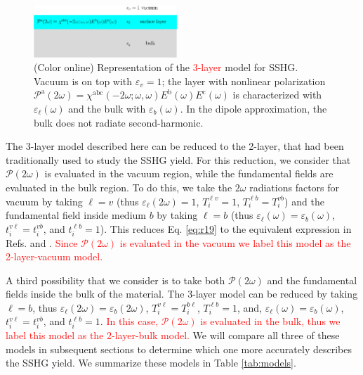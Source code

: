 \documentclass[prb,superscriptaddress,showpacs,twocolumn,letterpaper]{revtex4}
\newcommand{\correction}[1]{\textcolor{red}{#1}}
\begin{document}
\begin{figure}[t]
\centering 
\includegraphics[width=0.48\textwidth]{fig1}
\caption{(Color online) Representation of the \correction{3-layer} model for SSHG. 
Vacuum is on top with $\varepsilon_{v}=1$; the layer with nonlinear polarization 
$\mathcal{P}^{\mathrm{a}}(2\omega) =
\chi^{\mathrm{abc}}(-2\omega;\omega,\omega) 
E^{\mathrm{b}}(\omega)E^{\mathrm{c}}(\omega)$ is characterized with 
$\varepsilon_{\ell}(\omega)$ and the bulk with $\varepsilon_{b}(\omega)$. In the 
dipole approximation, the bulk does not radiate 
second-harmonic.\label{fig:3layer}}
\end{figure}

The 3-layer model described here can be reduced to the
2-layer,\cite{mizrahiJOSA88, sipePRB87,bloembergenPR62} that had been
traditionally used to study the SSHG yield. For this reduction, we consider that
$\boldsymbol{\mathcal{P}}(2\omega)$ is evaluated in the vacuum region, while the
fundamental fields are evaluated in the bulk region. To do this, we take the
$2\omega$ radiations factors for vacuum by taking $\ell=v$ (thus
$\varepsilon_{\ell}(2\omega)=1$, $T^{\ell v}_{i}=1$, $T^{\ell
b}_{i}=T^{vb}_{i}$) and the fundamental field inside medium $b$ by taking
$\ell=b$ (thus $\varepsilon_{\ell}(\omega)=\varepsilon_{b}(\omega)$,
$t^{v\ell}_{i}=t^{vb}_{i}$, and $t^{\ell b}_{i}=1$). This reduces Eq.
\eqref{eq:r19} to the equivalent expression in Refs. 
and .
\correction{
Since $\boldsymbol{\mathcal{P}}(2\omega)$ is evaluated in the vacuum 
we label this model as the 2-layer-vacuum model. 
}

A third possibility that we consider is to take both
$\boldsymbol{\mathcal{P}}(2\omega)$ and the fundamental fields inside the bulk
of the material. The 3-layer model can be reduced by taking $\ell=b$, thus
$\varepsilon_{\ell}(2\omega)=\varepsilon_{b}(2\omega)$,
$T^{v\ell}_{i}=T^{b\ell}_{i}$, $T^{\ell b}_{i}=1$, and,
$\varepsilon_{\ell}(\omega)=\varepsilon_{b}(\omega)$,
$t^{v\ell}_{i}=t^{vb}_{i}$, and $t^{\ell b}_{i}=1$.
\correction{
In this case, $\boldsymbol{\mathcal{P}}(2\omega)$ is evaluated in the
bulk, thus
we label this model as the 2-layer-bulk model. 
}
We will compare all three of
these models in subsequent sections to determine which one more accurately
describes the SSHG yield. We summarize these models in Table
\ref{tab:models}.
\end{document}
